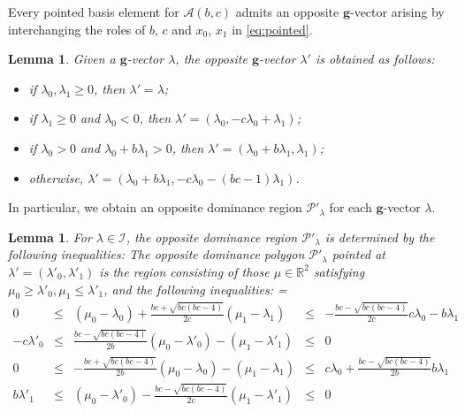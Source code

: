 \documentclass{amsart}
\newtheorem{lemma}[theorem]{Lemma}
\numberwithin{theorem}{section}
\newcommand{\bfg}{\boldsymbol{g}}
\newcommand{\cA}{\mathcal{A}}
\newcommand{\cI}{\mathcal{I}}
\newcommand{\cP}{\mathcal{P}}
\newcommand{\RR}{\mathbb{R}}
\begin{document}
  Every pointed basis element for $\cA(b,c)$ admits an opposite $\bfg$-vector arising by interchanging the roles of $b$, $c$ and $x_0$, $x_1$ in \eqref{eq:pointed}. 
  \begin{lemma}
    Given a $\bfg$-vector $\lambda$, the opposite $\bfg$-vector $\lambda'$ is obtained as follows:
    \begin{itemize}
      \item if $\lambda_0,\lambda_1\ge0$, then $\lambda'=\lambda$;
      \item if $\lambda_1\ge0$ and $\lambda_0<0$, then $\lambda'=(\lambda_0,-c\lambda_0+\lambda_1)$;
      \item if $\lambda_0>0$ and $\lambda_0+b\lambda_1>0$, then $\lambda'=(\lambda_0+b\lambda_1,\lambda_1)$;
      \item otherwise, $\lambda'=(\lambda_0+b\lambda_1,-c\lambda_0-(bc-1)\lambda_1)$.
    \end{itemize}
  \end{lemma}
  In particular, we obtain an opposite dominance region $\cP'_\lambda$ for each $\bfg$-vector $\lambda$.
  \begin{lemma}
    For $\lambda\in\cI$, the opposite dominance region $\cP'_\lambda$ is determined by the following inequalities:
    The opposite dominance polygon $\cP'_\lambda$ pointed at $\lambda'=(\lambda'_0,\lambda'_1)$ is the region consisting of those $\mu\in\RR^2$ satisfying $\mu_0 \geq \lambda'_0, \mu_1 \leq\lambda'_1$, and the following inequalities:
    {
      \everymath={\displaystyle}
      \def\arraystretch{2.8}
      \[
        \begin{array}{rcccl}
          0 & \leq & (\mu_0-\lambda_0)+\frac{b c+\sqrt{b c (b c-4)}}{2 c}(\mu_1-\lambda_1) & \leq & -\frac{b c-\sqrt{b c (b c-4)}}{2c}c\lambda_0-b\lambda_1
          \\
          -c\lambda'_0 & \leq & \frac{b c-\sqrt{b c (b c-4)}}{2 b}(\mu_0-\lambda'_0)-(\mu_1-\lambda'_1) & \leq & 0
          \\
          0 & \leq &  -\frac{b c+\sqrt{b c (b c-4)}}{2 b}(\mu_0-\lambda_0)-(\mu_1-\lambda_1) & \leq & c\lambda_0+\frac{b c-\sqrt{b c (b c-4)}}{2b}b\lambda_1
          \\
          b \lambda'_1 & \leq & (\mu_0-\lambda'_0) - \frac{b c-\sqrt{b c (b c-4)}}{2 c} (\mu_1-\lambda'_1) & \leq & 0
        \end{array}
      \]
    }
  \end{lemma}
\end{document}
